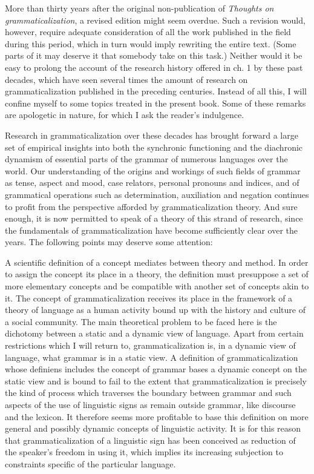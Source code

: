 
More than thirty years after the original non-publication of \textit{Thoughts on grammaticalization}, a revised edition might seem overdue. Such a revision would, however, require adequate consideration of all the work published in the field during this period, which in turn would imply rewriting the entire text. (Some parts of it may deserve it that somebody take on this task.) Neither would it be easy to prolong the account of the research history offered in ch. 1 by these past decades, which have seen several times the amount of research on grammaticalization published in the preceding centuries. Instead of all this, I will confine myself to some topics treated in the present book. Some of these remarks are apologetic in nature, for which I ask the reader’s indulgence.

Research in grammaticalization over these decades has brought forward a large set of empirical insights into both the synchronic functioning and the diachronic dynamism of essential parts of the grammar of numerous languages over the world. Our understanding of the origins and workings of such fields of grammar as tense, aspect and mood, case relators, personal pronouns and indices, and of grammatical operations such as determination, auxiliation and negation continues to profit from the perspective afforded by grammaticalization theory. And sure enough, it is now permitted to speak of a theory of this strand of research, since the fundamentals of grammaticalization have become sufficiently clear over the years. The following points may deserve some attention:

A scientific definition of a concept mediates between theory and method. In order to assign the concept its place in a theory, the definition must presuppose a set of more elementary concepts and be compatible with another set of concepts akin to it. The concept of grammaticalization receives its place in the framework of a theory of language as a human activity bound up with the history and culture of a social community.  The main theoretical problem to be faced here is the dichotomy between a static and a dynamic view of language. Apart from certain restrictions which I will return to, grammaticalization is, in a dynamic view of language, what grammar is in a static view. A definition of grammaticalization whose definiens includes the concept of grammar bases a dynamic concept on the static view and is bound to fail to the extent that grammaticalization is precisely the kind of process which traverses the boundary between grammar and such aspects of the use of linguistic signs as remain outside grammar, like discourse and the lexicon. It therefore seems more profitable to base this definition on more general and possibly dynamic concepts of linguistic activity. It is for this reason that grammaticalization of a linguistic sign has been conceived as reduction of the speaker’s freedom in using it, which implies its increasing subjection to constraints specific of the particular language.

